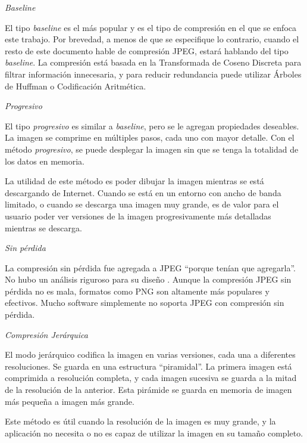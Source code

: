 \begin{list}{}{} \item \emph{Baseline}

El tipo \emph{\gls{baseline}} es el más popular y es el tipo de compresión en el que
se enfoca este trabajo. Por brevedad, a menos de que se especifique lo
contrario, cuando el resto de este documento hable de compresión JPEG, estará
hablando del tipo \emph{baseline}. La compresión está basada en la Transformada
de Coseno Discreta para filtrar información innecesaria, y para reducir
redundancia puede utilizar Árboles de Huffman o Codificación Aritmética.

\item \emph{Progresivo}

El tipo \emph{progresivo} es similar a \emph{baseline}, pero se le agregan
propiedades deseables. La imagen se comprime en múltiples pasos, cada uno con
mayor detalle. Con el método \emph{progresivo}, se puede desplegar la imagen
sin que se tenga la totalidad de los datos en memoria.

La utilidad de este método es poder dibujar la imagen mientras se está
descargando de Internet. Cuando se está en un entorno con ancho de banda
limitado, o cuando se descarga una imagen muy grande, es de valor para el
usuario poder ver versiones de la imagen progresivamente más detalladas
mientras se descarga.

\item \emph{Sin pérdida}

La compresión sin pérdida fue agregada a JPEG ``porque tenían que agregarla''.
No hubo un análisis riguroso para su diseño \cite{jpeg-spec}. Aunque la
compresión JPEG sin pérdida no es mala, formatos como PNG son altamente más
populares y efectivos. Mucho software simplemente no soporta JPEG con
compresión sin pérdida.

\item \emph{Compresión Jerárquica}

El modo jerárquico codifica la imagen en varias versiones, cada una a
diferentes resoluciones. Se guarda en una estructura ``piramidal''. La primera
imagen está comprimida a resolución completa, y cada imagen sucesiva se guarda
a la mitad de la resolución de la anterior. Esta pirámide se guarda en memoria
de imagen más pequeña a imagen más grande.

Este método es útil cuando la resolución de la imagen es muy grande, y la
aplicación no necesita o no es capaz de utilizar la imagen en su tamaño
completo.

\end{list}

